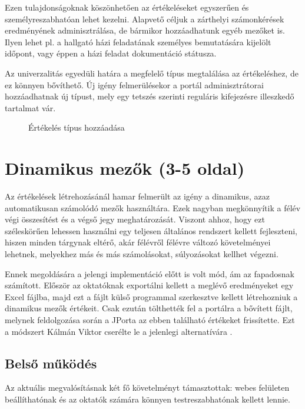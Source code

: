 Ezen tulajdonságoknak köszönhetően az értékeléseket egyszerűen és személyreszabhatóan lehet kezelni. Alapvető céljuk a zárthelyi számonkérések eredményének adminisztrálása, de bármikor hozzáadhatunk egyéb mezőket is. Ilyen lehet pl. a hallgató házi feladatának személyes bemutatására kijelölt időpont, vagy éppen a házi feladat dokumentáció státusza.

Az univerzalitás egyedüli határa a megfelelő típus megtalálása az értékeléshez, de ez könnyen bővíthető. Új igény felmerülésekor a portál adminisztrátorai hozzáadhatnak új típust, mely egy tetszés szerinti reguláris kifejezésre illeszkedő tartalmat vár.

\begin{figure}[p]
    \centering
    \caption{Értékelés típus hozzáadása}
    \label{fig:jporta_add_result}
\end{figure}

\section{Dinamikus mezők (3-5 oldal)}\label{section:dynamic-assessments}

Az értékelések létrehozásánál hamar felmerült az igény a dinamikus, azaz automatikusan számolódó mezők használtára. Ezek nagyban megkönnyítik a félév végi összesítést és a végső jegy meghatározását. Viszont ahhoz, hogy ezt széleskörűen lehessen használni egy teljesen általános rendszert kellett fejleszteni, hiszen minden tárgynak eltérő, akár félévről félévre változó követelményei lehetnek, melyekhez más és más számolásokat, súlyozásokat kellhet végezni. 

Ennek megoldására a jelengi implementáció előtt is volt mód, ám az fapadosnak számított. Először az oktatóknak exportálni kellett a meglévő eredményeket egy Excel fájlba, majd ezt a fájlt külső programmal szerkesztve kellett létrehozniuk a dinamikus mezők értékeit. Csak ezután tölthették fel a portálra a bővített fájlt, melynek feldolgozása során a JPorta az ebben található értékeket frissítette. Ezt a módszert Kálmán Viktor cserélte le a jelenlegi alternatívára \cite{KalmanMsc}.

\subsection{Belső működés}
Az aktuális megvalósításnak két fő követelményt támasztottak: webes felületen beállíthatónak és az oktatók számára könnyen testreszabhatónak kellett lennie.


